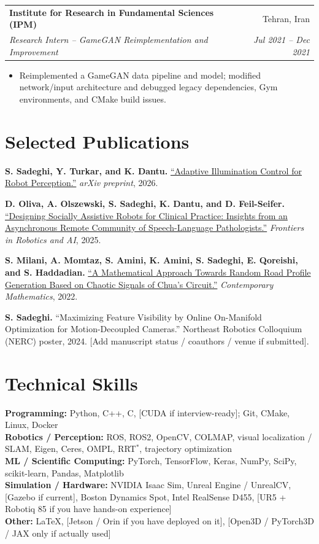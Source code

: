 \documentclass[10.5pt,letterpaper]{article}
\makeatletter
\newcommand{\todo}[1]{\textcolor{placeholder}{[#1]}}
\newcommand{\resumeSubheading}[4]{
  \begin{tabularx}{\textwidth}{@{}Xr@{}}
    \textbf{#1} & #2 \\
    \textit{#3} & \textit{#4}
  \end{tabularx}
  \vspace{-2pt}
}
\newcommand{\resumePub}[3]{
  \textbf{#1} #2 \hfill #3\\[-1pt]
}
\newcommand{\resumeItem}[1]{\item \small #1}
\makeatother
\begin{document}
\resumeSubheading
{Institute for Research in Fundamental Sciences (IPM)}{Tehran, Iran}
{Research Intern -- GameGAN Reimplementation and Improvement}{Jul 2021 -- Dec 2021}
\begin{itemize}
    \resumeItem{Reimplemented a GameGAN data pipeline and model; modified network/input architecture and debugged legacy dependencies, Gym environments, and CMake build issues.}
\end{itemize}

\section{Selected Publications}

\resumePub
{\textbf{S. Sadeghi}, Y. Turkar, and K. Dantu.}
{\href{https://arxiv.org/abs/2602.15900}{``Adaptive Illumination Control for Robot Perception.''}
\textit{arXiv preprint}, 2026.}
{}

\vspace{3pt}
\resumePub
{D. Oliva, A. Olszewski, \textbf{S. Sadeghi}, K. Dantu, and D. Feil-Seifer.}
{\href{https://doi.org/10.3389/frobt.2025.1646880}{``Designing Socially Assistive Robots for Clinical Practice: Insights from an Asynchronous Remote Community of Speech-Language Pathologists.''}
\textit{Frontiers in Robotics and AI}, 2025.}
{}

\vspace{3pt}
\resumePub
{S. Milani, A. Momtaz, S. Amini, K. Amini, \textbf{S. Sadeghi}, E. Qoreishi, and S. Haddadian.}
{\href{https://doi.org/10.37256/cm.3120221151}{``A Mathematical Approach Towards Random Road Profile Generation Based on Chaotic Signals of Chua's Circuit.''}
\textit{Contemporary Mathematics}, 2022.}
{}

\vspace{3pt}
\resumePub
{\textbf{S. Sadeghi}.}
{``Maximizing Feature Visibility by Online On-Manifold Optimization for Motion-Decoupled Cameras.'' 
Northeast Robotics Colloquium (NERC) poster, 2024. \todo{Add manuscript status / coauthors / venue if submitted}.}
{}

\section{Technical Skills}

\small
\textbf{Programming:} Python, C++, C, \todo{CUDA if interview-ready}; Git, CMake, Linux, Docker\\
\textbf{Robotics / Perception:} ROS, ROS2, OpenCV, COLMAP, visual localization / SLAM, Eigen, Ceres, OMPL, RRT$^\ast$, trajectory optimization\\
\textbf{ML / Scientific Computing:} PyTorch, TensorFlow, Keras, NumPy, SciPy, scikit-learn, Pandas, Matplotlib\\
\textbf{Simulation / Hardware:} NVIDIA Isaac Sim, Unreal Engine / UnrealCV, \todo{Gazebo if current}, Boston Dynamics Spot, Intel RealSense D455, \todo{UR5 + Robotiq 85 if you have hands-on experience}\\
\textbf{Other:} LaTeX, \todo{Jetson / Orin if you have deployed on it}, \todo{Open3D / PyTorch3D / JAX only if actually used}
\end{document}
